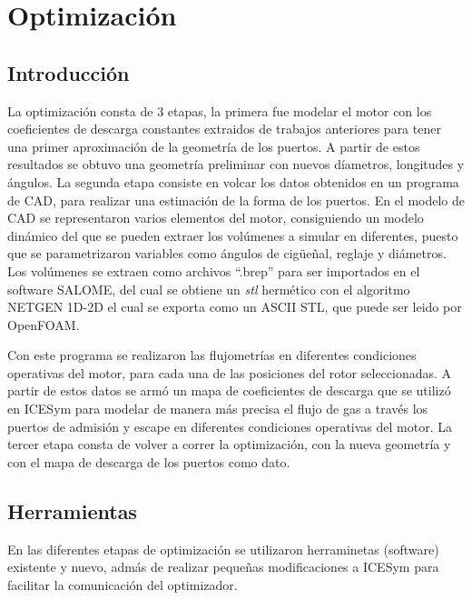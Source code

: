 \chapter{Optimización}

\section{Introducción}
La optimización consta de 3 etapas, la primera fue modelar el motor con los
coeficientes de descarga constantes extraidos de trabajos anteriores para tener
una primer aproximación de la geometría de los puertos.
%
A partir de estos resultados se obtuvo una geometría preliminar con nuevos
díametros, longitudes y ángulos.
%
La segunda etapa consiste en volcar los datos obtenidos en un programa de CAD,
para realizar una estimación de la forma de los puertos.
%
En el modelo de CAD se representaron varios elementos del motor, consiguiendo un
modelo dinámico del que se pueden extraer los volúmenes a simular en diferentes,
puesto que se parametrizaron variables como ángulos de cigüeñal, reglaje y
diámetros.
%
Los volúmenes se extraen como archivos ``.brep'' para ser importados en el
software SALOME, del cual se obtiene un \emph{stl} hermético con el algoritmo
NETGEN 1D-2D el cual se exporta como un ASCII STL, que puede ser leido por
OpenFOAM.

Con este programa se realizaron las flujometrías en diferentes condiciones
operativas del motor, para cada una de las posiciones del rotor seleccionadas.
%
A partir de estos datos se armó un mapa de coeficientes de descarga que se
utilizó en ICESym para modelar de manera más precisa el flujo de gas a través
los puertos de admisión y escape en diferentes condiciones operativas del motor.
%
La tercer etapa consta de volver a correr la optimización, con la nueva
geometría y con el mapa de descarga de los puertos como dato.

\section{Herramientas}
%
En las diferentes etapas de optimización se utilizaron herraminetas (software)
existente y nuevo, admás de realizar pequeñas modificaciones a ICESym para
facilitar la comunicación del optimizador.

